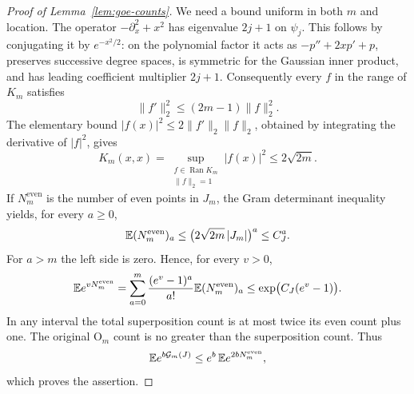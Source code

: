 \begin{proof}[Proof of Lemma~\ref{lem:goe-counts}]
We need a bound uniform in both \(m\) and location.
The operator \(-\partial_x^2+x^2\) has eigenvalue \(2j+1\) on
\(\psi_j\). This follows by conjugating it by \(e^{-x^2/2}\):
on the polynomial factor it acts as
\(-p''+2xp'+p\), preserves successive degree spaces, is symmetric
for the Gaussian inner product, and has leading coefficient
multiplier \(2j+1\).
Consequently every \(f\) in the range of \(K_m\) satisfies
\[
 \|f'\|_2^2\le(2m-1)\|f\|_2^2.
\]
The elementary bound
\(|f(x)|^2\le2\|f'\|_2\|f\|_2\), obtained by integrating the
derivative of \(|f|^2\), gives
\[
 K_m(x,x)
   =\sup_{\substack{f\in\operatorname{Ran}K_m\\\|f\|_2=1}}
       |f(x)|^2
   \le2\sqrt{2m}.
\]
If \(N_m^{\mathrm{even}}\) is the number of even points in \(J_m\),
the Gram determinant inequality yields, for every \(a\ge0\),
\[
 \mathbb E(N_m^{\mathrm{even}})_a
   \le \bigl(2\sqrt{2m}\,|J_m|\bigr)^a\le C_J^a.
\]
For \(a>m\) the left side is zero. Hence, for every \(v>0\),
\[
 \mathbb E e^{vN_m^{\mathrm{even}}}
   =\sum_{a=0}^m
       \frac{(e^v-1)^a}{a!}\mathbb E(N_m^{\mathrm{even}})_a
   \le\exp\bigl(C_J(e^v-1)\bigr).
\]
In any interval the total superposition count is at most twice
its even count plus one. The original \(\mathrm O_m\) count is
no greater than the superposition count. Thus
\[
 \mathbb E e^{b\mathcal G_m(J)}
   \le e^b\,\mathbb E e^{2bN_m^{\mathrm{even}}},
\]
which proves the assertion.
\end{proof}
